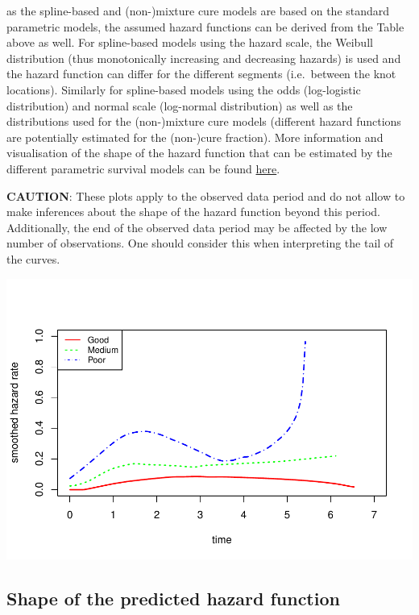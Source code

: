 \documentclass[
]{article}
\begin{document}
as the spline-based and (non-)mixture cure models are based on the
standard parametric models, the assumed hazard functions can be derived
from the Table above as well. For spline-based models using the hazard
scale, the Weibull distribution (thus monotonically increasing and
decreasing hazards) is used and the hazard function can differ for the
different segments (i.e.~between the knot locations). Similarly for
spline-based models using the odds (log-logistic distribution) and
normal scale (log-normal distribution) as well as the distributions used
for the (non-)mixture cure models (different hazard functions are
potentially estimated for the (non-)cure fraction). More information and
visualisation of the shape of the hazard function that can be estimated
by the different parametric survival models can be found
\href{https://devinincerti.com/2019/06/18/parametric_survival.html}{here}.

\textbf{CAUTION}: These plots apply to the observed data period and do
not allow to make inferences about the shape of the hazard function
beyond this period. Additionally, the end of the observed data period
may be affected by the low number of observations. One should consider
this when interpreting the tail of the curves.

\begin{flushleft}\includegraphics{Images/plot_hr-1} \end{flushleft}

\clearpage

\hypertarget{shape-of-the-predicted-hazard-function}{%
\subsection{Shape of the predicted hazard
function}\label{shape-of-the-predicted-hazard-function}}
\end{document}
